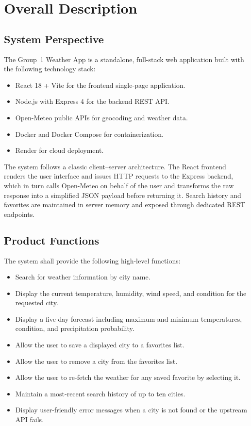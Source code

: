 \documentclass[11pt,letterpaper]{article}
\begin{document}
\section{Overall Description}

\subsection{System Perspective}
The Group~1 Weather App is a standalone, full-stack web application built with the following technology stack:
\begin{itemize}
  \item React 18 + Vite for the frontend single-page application.
  \item Node.js with Express 4 for the backend REST API.
  \item Open-Meteo public APIs for geocoding and weather data.
  \item Docker and Docker Compose for containerization.
  \item Render for cloud deployment.
\end{itemize}
The system follows a classic client--server architecture. The React frontend renders the user interface and issues HTTP requests to the Express backend, which in turn calls Open-Meteo on behalf of the user and transforms the raw response into a simplified JSON payload before returning it. Search history and favorites are maintained in server memory and exposed through dedicated REST endpoints.

\subsection{Product Functions}
The system shall provide the following high-level functions:
\begin{itemize}
  \item Search for weather information by city name.
  \item Display the current temperature, humidity, wind speed, and condition for the requested city.
  \item Display a five-day forecast including maximum and minimum temperatures, condition, and precipitation probability.
  \item Allow the user to save a displayed city to a favorites list.
  \item Allow the user to remove a city from the favorites list.
  \item Allow the user to re-fetch the weather for any saved favorite by selecting it.
  \item Maintain a most-recent search history of up to ten cities.
  \item Display user-friendly error messages when a city is not found or the upstream API fails.
\end{itemize}
\end{document}

